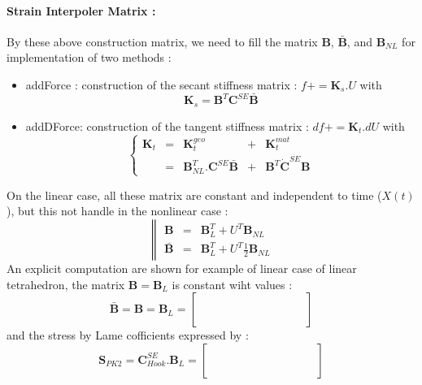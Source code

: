 \documentclass[a4paper,10pt]{article}
\begin{document}
\paragraph{Strain Interpoler Matrix :} By these above construction matrix, we need to fill the matrix $\textbf{B}$, $\bar{\textbf{B}}$, and $\textbf{B}_{NL}$ for implementation of two methods :
\begin{itemize}
 \item addForce : construction of the secant stiffness matrix : $f+= \textbf{K}_s.U $ with
      \[     \textbf{K}_s =  \textbf{B}^T \textbf{C}^{SE}\bar{\textbf{B}}   \]
 \item addDForce: construction of the tangent stiffness matrix : $df+= \textbf{K}_t.dU $ with
      \[
      \left\{ 
      \begin{array}{ccccc}
	\textbf{K}_t   &=& \textbf{K}^{geo}_t &+& \textbf{K}^{mat}_t \\
                       &=& \textbf{B}^T_{NL}.\textbf{C}^{SE} \bar{\textbf{B}} & + &\textbf{B}^T \dot{\textbf{C}}^{SE} \textbf{B} 
      \end{array}\right.
      \]
\end{itemize}
On the linear case, all these matrix are constant and independent to time ($X(t)$), but this not handle in the nonlinear case : 
\[
\left\| 
\begin{array}{rcl}
      \textbf{B}   &=&  \textbf{B}^T_L +  U^T \textbf{B}_{NL}                               \\ 
 \bar{\textbf{B}}  &=&  \textbf{B}^T_L +  U^T \frac{1}{2}\textbf{B}_{NL}           
\end{array}\right.
\]
An explicit computation are shown for example of linear case of linear tetrahedron, the matrix $\textbf{B}=\textbf{B}_L$ is constant wiht values : 
\[
\bar{\textbf{B}}=\textbf{B}=\textbf{B}_L=
\left[ 
\begin{array}{cccccccccccc}
 & & & & & & & & & & & \\
 & & & & & & & & & & & \\
 & & & & & & & & & & & \\
 & & & & & & & & & & & \\
 & & & & & & & & & & & \\
 & & & & & & & & & & &         
\end{array}
\right]
\]
and the stress by Lame cofficients expressed by :
\[
\textbf{S}_{PK2}=\textbf{C}^{SE}_{Hook}.\textbf{B}_{L}=
\left[ 
\begin{array}{cccccccccccc}
 & & & & & & & & & & & \\
 & & & & & & & & & & & \\
 & & & & & & & & & & & \\
 & & & & & & & & & & & \\
 & & & & & & & & & & & \\
 & & & & & & & & & & &         
\end{array}
\right]
\]
\end{document}
